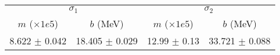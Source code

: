 \begin{tabular}{cc|cc}
\multicolumn{2}{c|}{$\sigma_1$} & \multicolumn{2}{|c}{$\sigma_2$} \\
$m$ ($\times1e5$) & $b$ (MeV) & $m$ ($\times1e5$) & $b$ (MeV) \\
\hline
8.622 $\pm$ 0.042 & 18.405 $\pm$ 0.029 & 12.99 $\pm$ 0.13 & 33.721 $\pm$ 0.088\\
\end{tabular}
